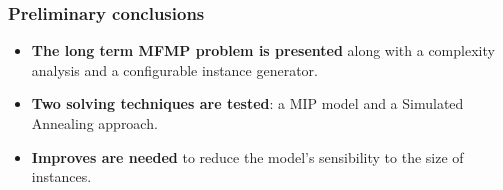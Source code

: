 \begin{frame}
\frametitle{\textbf{Preliminary conclusions}}
    \begin{itemize}[<+->]
    \item \textbf{The long term MFMP problem is presented}
      along with a complexity analysis and a configurable instance generator.
    \item \textbf{Two solving techniques are tested}:
      a MIP model and a Simulated Annealing approach.  
    \item \textbf{Improves are needed} 
      to reduce the model's sensibility to the size of instances.
    \end{itemize}
      
        
\end{frame}
